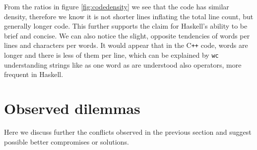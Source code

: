 \documentclass[
  digital, %
  color,   %
  table,   %
  oneside, %
  lof,     %
  lot,     %
]{fithesis3}
\newcommand{\cpp}{C\nolinebreak\texttt{+}\nolinebreak\texttt{+}}
\newcommand{\vs}{vs.\ }
\begin{document}
{From the ratios in figure \ref{fig:codedensity} we see that the code has similar density,
therefore we know it is not shorter lines inflating the total line count, but generally longer code.
This further supports the claim for Haskell's ability to be brief and concise.
We can also notice the slight, opposite tendencies of words per lines and characters per words.
It would appear that in the \cpp{} code, words are longer and there is less of them per line,
which can be explained by \texttt{wc} understanding strings like
 as one word as are understood also operators, more frequent in Haskell.











\section{Observed dilemmas}
\label{sect:dilemmas}

Here we discuss further the conflicts observed in the previous section
and suggest possible better compromises or solutions.



}
\end{document}
